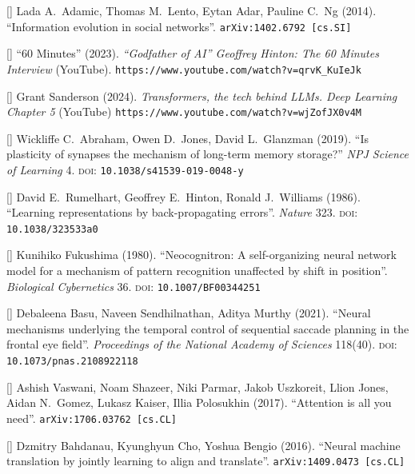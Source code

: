 \documentclass[12pt]{article}
\newcommand{\citestrut}[1]{\vphantom{[}{#1}\vphantom{]}}
\newcommand{\custombibitem}[3]{\hypertarget{#1}{[\href{#2}{\citestrut{#1}}] {#3}}}
\begin{document}
\custombibitem{FacebookMemes}{https://arxiv.org/abs/1402.6792}
{Lada A.\ Adamic, Thomas M.\ Lento, Eytan Adar, Pauline C.\ Ng (2014).
``Information evolution in social networks''.
{\tt arXiv:1402.6792 [cs.SI]}}

\custombibitem{GeoffreyHinton}{https://www.youtube.com/watch?v=qrvK_KuIeJk}
{``60 Minutes'' (2023).
\textit{``Godfather of AI'' Geoffrey Hinton: The 60 Minutes Interview} (YouTube).
{\tt https://www.youtube.com/watch?v=qrvK\_KuIeJk}}

\custombibitem{3Blue1Brown}{https://www.youtube.com/watch?v=wjZofJX0v4M}
{Grant Sanderson (2024).
\textit{Transformers, the tech behind LLMs. Deep Learning Chapter 5} (YouTube)
{\tt https://www.youtube.com/watch?v=wjZofJX0v4M}}

\custombibitem{SynapticPlasticity}{https://www.nature.com/articles/s41539-019-0048-y}
{Wickliffe C.\ Abraham, Owen D.\ Jones, David L.\ Glanzman (2019).
``Is plasticity of synapses the mechanism of long-term memory storage?''
\textit{NPJ Science of Learning} 4.
\textsc{doi}: {\tt 10.1038/s41539-019-0048-y}}

\custombibitem{Backpropagation}{https://www.nature.com/articles/323533a0}
{David E.\ Rumelhart, Geoffrey E.\ Hinton, Ronald J.\ Williams (1986).
``Learning representations by back-propagating errors''.
\textit{Nature} 323.
\textsc{doi}: {\tt 10.1038/323533a0}}

\custombibitem{Convolution}{https://link.springer.com/article/10.1007/BF00344251}
{Kunihiko Fukushima (1980).
``Neocognitron: A self-organizing neural network model for a mechanism of pattern
recognition unaffected by shift in position''.
\textit{Biological Cybernetics} 36.
\textsc{doi}: {\tt 10.1007/BF00344251}}

\custombibitem{Saccades}{https://www.pnas.org/doi/abs/10.1073/pnas.2108922118}
{Debaleena Basu, Naveen Sendhilnathan, Aditya Murthy (2021).
``Neural mechanisms underlying the temporal control of sequential saccade planning in the
frontal eye field''.
\textit{Proceedings of the National Academy of Sciences} 118(40).
\textsc{doi}: {\tt 10.1073/pnas.2108922118}}

\custombibitem{Transformers}{https://arxiv.org/abs/1706.03762}
{Ashish Vaswani, Noam Shazeer, Niki Parmar, Jakob Uszkoreit, Llion Jones, Aidan
N.\ Gomez, Lukasz Kaiser, Illia Polosukhin (2017).
``Attention is all you need''.
{\tt arXiv:1706.03762 [cs.CL]}}

\custombibitem{Attention}{https://arxiv.org/abs/1409.0473}
{Dzmitry Bahdanau, Kyunghyun Cho, Yoshua Bengio (2016).
``Neural machine translation by jointly learning to align and translate''.
{\tt arXiv:1409.0473 [cs.CL]}}
\end{document}
